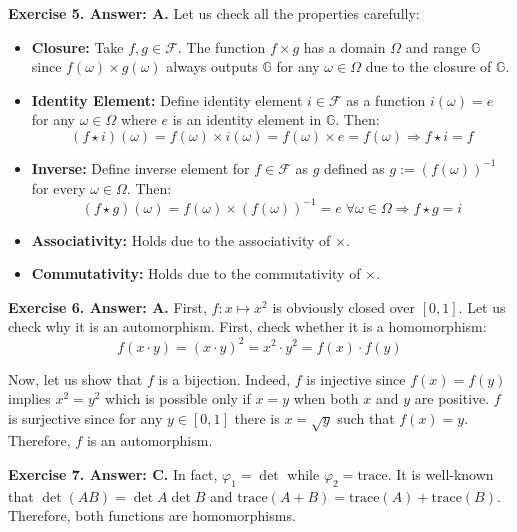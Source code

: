 \documentclass[../../book]{subfiles}
\begin{document}
\textbf{Exercise 5. Answer: A.} Let us check all the properties carefully:
\begin{itemize}
    \item \textbf{Closure:} Take $f,g \in \mathcal{F}$. The function $f \times
    g$ has a domain $\Omega$ and range $\mathbb{G}$ since $f(\omega)\times
    g(\omega)$ always outputs $\mathbb{G}$ for any $\omega \in \Omega$ due to
    the closure of $\mathbb{G}$.
    \item \textbf{Identity Element:} Define identity element $i \in \mathcal{F}$
    as a function $i(\omega) = e$ for any $\omega \in \Omega$ where $e$ is an
    identity element in $\mathbb{G}$. Then:
    \begin{equation*}
        (f \star i)(\omega) = f(\omega) \times i(\omega) = f(\omega) \times e = f(\omega) \Rightarrow f \star i = f
    \end{equation*}
    \item \textbf{Inverse:} Define inverse element for $f \in \mathcal{F}$ as 
    $g$ defined as $g := (f(\omega))^{-1}$ for every $\omega \in \Omega$. Then:
    \begin{equation*}
        (f \star g)(\omega) = f(\omega) \times (f(\omega))^{-1} = e \; \forall \omega \in \Omega \Rightarrow f \star g = i
    \end{equation*}
    \item \textbf{Associativity:} Holds due to the associativity of $\times$.
    \item \textbf{Commutativity:} Holds due to the commutativity of $\times$.
\end{itemize}

\textbf{Exercise 6. Answer: A.} First, $f: x \mapsto x^2$ is obviously closed over
$[0,1]$. Let us check why it is an automorphism. First, check whether it is a homomorphism:
\begin{equation*}
    f(x \cdot y) = (x \cdot y)^2 = x^2 \cdot y^2 = f(x) \cdot f(y)
\end{equation*}

Now, let us show that $f$ is a bijection. Indeed, $f$ is injective since
$f(x)=f(y)$ implies $x^2=y^2$ which is possible only if $x=y$ when both $x$ and
$y$ are positive. $f$ is surjective since for any $y \in [0,1]$ there is 
$x=\sqrt{y}$ such that $f(x)=y$. Therefore, $f$ is an automorphism.

\textbf{Exercise 7. Answer: C.} In fact, $\varphi_1=\det$ while
$\varphi_2=\text{trace}$. It is well-known that $\det(AB)=\det A \det B$ and
$\text{trace}(A+B)=\text{trace}(A)+\text{trace}(B)$. Therefore, both 
functions are homomorphisms.
\end{document}
